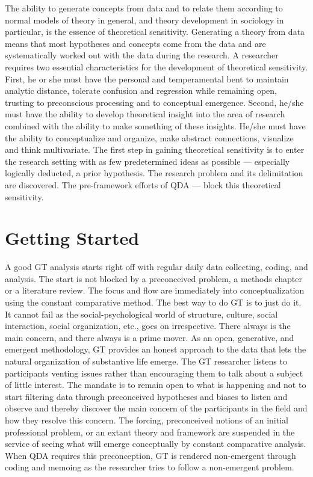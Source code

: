 The ability to generate concepts from data and to relate them according to normal models of theory in general, and theory development in sociology in particular, is the essence of theoretical sensitivity. 
Generating a theory from data means that most hypotheses and concepts come from the data and are systematically worked out with the data during the research. 
A researcher requires two essential characteristics for the development of theoretical sensitivity. 
First, he or she must have the personal and temperamental bent to maintain analytic distance, tolerate confusion and regression while remaining open, trusting to preconscious processing and to
conceptual emergence. 
Second, he/she must have the ability to develop theoretical insight into the area of research combined with the ability to make something of these insights. 
He/she must have the ability to conceptualize and organize, make abstract connections, visualize and think multivariate. 
The first step in gaining theoretical sensitivity is to enter the research setting with as few predetermined ideas as possible
--- especially logically deducted, a prior hypothesis. 
The research problem and its delimitation are discovered. 
The pre-framework efforts of QDA --- block this theoretical sensitivity.

\section*{Getting Started}

A good GT analysis starts right off with regular daily data collecting, coding, and analysis. 
The start is not blocked by a preconceived problem, a methods chapter
or a literature review. 
The focus and flow are immediately into conceptualization using the constant comparative method. 
The best way to do GT is to just do it. 
It cannot fail as the social-psychological world of structure, culture, social
interaction, social organization, etc., goes on irrespective. 
There always is the main concern, and there always is a prime mover. 
As an open, generative, and emergent methodology, 
GT provides an honest approach to the data that lets the natural organization of substantive life emerge. 
The GT researcher listens to participants venting issues rather than encouraging them to talk about a subject of little interest. 
The mandate is to remain open to what is happening and not to start filtering data through preconceived hypotheses and biases to listen and observe and thereby discover the main concern of the participants in the field and how they resolve this concern. 
The forcing, preconceived notions of an initial professional problem, 
or an extant theory and framework are suspended in the service of seeing what will emerge conceptually by constant comparative analysis. 
When QDA requires this preconception, GT is rendered non-emergent through coding and memoing as the researcher tries to follow a non-emergent problem.

